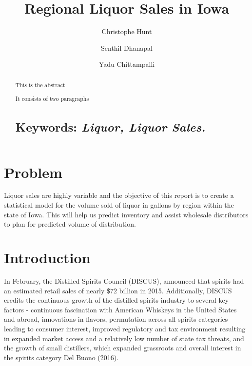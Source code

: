 \documentclass[]{elsarticle} %
\begin{document}
\begin{frontmatter}

  \title{Regional Liquor Sales in Iowa}
    \author[CUNY School of Professional Studies]{Christophe Hunt}
    \author[CUNY School of Professional Studies]{Senthil Dhanapal}
  
    \author[CUNY School of Professional Studies]{Yadu Chittampalli}
  
      \address[CUNY School of Professional Studies]{CUNY School of Professional Studies, Data Analytics, New York, NY}
  
  \begin{abstract}
  This is the abstract.
  
  It consists of two paragraphs
  
  \section{\texorpdfstring{Keywords: \emph{Liquor, Liquor
  Sales.}}{Keywords: Liquor, Liquor Sales.}}\label{keywords-liquor-liquor-sales.}
  \end{abstract}
  
 \end{frontmatter}

\section{Problem}\label{problem}

Liquor sales are highly variable and the objective of this report is to
create a statistical model for the volume sold of liquor in gallons by
region within the state of Iowa. This will help us predict inventory and
assist wholesale distributors to plan for predicted volume of
distribution.

\section{Introduction}\label{introduction}

In February, the Distilled Spirits Council (DISCUS), announced that
spirits had an estimated retail sales of nearly \$72 billion in 2015.
Additionally, DISCUS credits the continuous growth of the distilled
spirits industry to several key factors - continuous fascination with
American Whiskeys in the United States and abroad, innovations in
flavors, permutation across all spirits categories leading to consumer
interest, improved regulatory and tax environment resulting in expanded
market access and a relatively low number of state tax threats, and the
growth of small distillers, which expanded grassroots and overall
interest in the spirits category Del Buono (2016).
\end{document}

